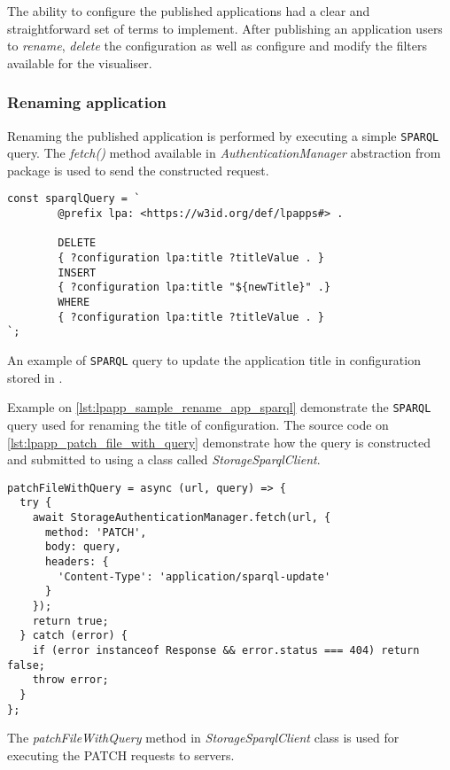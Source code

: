 The ability to configure the published applications had a clear and straightforward set of terms to implement. After publishing an application \lpa{} users  to \textit{rename}, \textit{delete} the configuration as well as configure and modify the filters available for the visualiser.

\subsubsection{Renaming application}

Renaming the published application is performed by executing a simple \texttt{SPARQL} query. The \textit{fetch()} method available in \textit{AuthenticationManager} abstraction from \lpas{} package is used to send the constructed request. 

\begin{listing}[H]    
\begin{verbatim}
const sparqlQuery = `
        @prefix lpa: <https://w3id.org/def/lpapps#> .

        DELETE
        { ?configuration lpa:title ?titleValue . }
        INSERT
        { ?configuration lpa:title "${newTitle}" .}
        WHERE
        { ?configuration lpa:title ?titleValue . }
`;
\end{verbatim}
\caption{An example of \texttt{SPARQL} query to update the application title in configuration stored in \solid{}.} 
\label{lst:lpapp_sample_rename_app_sparql}
\end{listing}

Example on \autoref{lst:lpapp_sample_rename_app_sparql} demonstrate the \texttt{SPARQL} query used for renaming the title of \lpa{} configuration. The source code on \autoref{lst:lpapp_patch_file_with_query} demonstrate how the query is constructed and submitted to \solid{} using a class called \textit{StorageSparqlClient}.

\begin{listing}[H]    
\begin{verbatim}
patchFileWithQuery = async (url, query) => {
  try {
    await StorageAuthenticationManager.fetch(url, {
      method: 'PATCH',
      body: query,
      headers: {
        'Content-Type': 'application/sparql-update'
      }
    });
    return true;
  } catch (error) {
    if (error instanceof Response && error.status === 404) return false;
    throw error;
  }
};
\end{verbatim}
\caption{The \textit{patchFileWithQuery} method in \textit{StorageSparqlClient} class is used for executing the PATCH requests to \solid{} servers.} 
\label{lst:lpapp_patch_file_with_query}
\end{listing}

